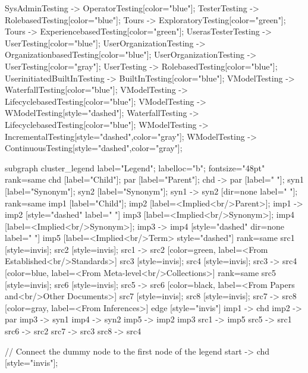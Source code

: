 \documentclass{article}
\begin{document}
{SysAdminTesting -> OperatorTesting[color="blue"];
TesterTesting -> RolebasedTesting[color="blue"];
Tours -> ExploratoryTesting[color="green"];
Tours -> ExperiencebasedTesting[color="green"];
UserasTesterTesting -> UserTesting[color="blue"];
UserOrganizationTesting -> OrganizationbasedTesting[color="blue"];
UserOrganizationTesting -> UserTesting[color="gray"];
UserTesting -> RolebasedTesting[color="blue"];
UserinitiatedBuiltInTesting -> BuiltInTesting[color="blue"];
VModelTesting -> WaterfallTesting[color="blue"];
VModelTesting -> LifecyclebasedTesting[color="blue"];
VModelTesting -> WModelTesting[style="dashed"];
WaterfallTesting -> LifecyclebasedTesting[color="blue"];
WModelTesting -> IncrementalTesting[style="dashed",color="gray"];
WModelTesting -> ContinuousTesting[style="dashed",color="gray"];

subgraph cluster_legend {
    label="Legend";
    labelloc="b";
    fontsize="48pt"
    {
        rank=same
        chd [label="Child"];
        par [label="Parent"];
        chd -> par [label="                "];
        syn1 [label="Synonym"];
        syn2 [label="Synonym"];
        syn1 -> syn2 [dir=none label="                "];
    }
    {
        rank=same
        imp1 [label="Child"];
        imp2 [label=<Implied<br/>Parent>];
        imp1 -> imp2 [style="dashed" label="                "]
        imp3 [label=<Implied<br/>Synonym>];
        imp4 [label=<Implied<br/>Synonym>];
        imp3 -> imp4 [style="dashed" dir=none label="                "]
    }
        imp5 [label=<Implied<br/>Term> style="dashed"]
{
rank=same
src1 [style=invis];
src2 [style=invis];
src1 -> src2 [color=green, label=<From Established<br/>Standards>]
src3 [style=invis];
src4 [style=invis];
src3 -> src4 [color=blue, label=<From Meta-level<br/>Collections>]
}
{
rank=same
src5 [style=invis];
src6 [style=invis];
src5 -> src6 [color=black, label=<From Papers and<br/>Other Documents>]
src7 [style=invis];
src8 [style=invis];
src7 -> src8 [color=gray, label=<From Inferences>]
}
    edge [style="invis"]
    imp1 -> chd
    imp2 -> par
    imp3 -> syn1
    imp4 -> syn2
imp5 -> { imp2 imp3 }
src1 -> imp5
src5 -> src1
src6 -> src2
src7 -> src3
src8 -> src4
}

// Connect the dummy node to the first node of the legend
start -> chd [style="invis"];
}
\end{document}
